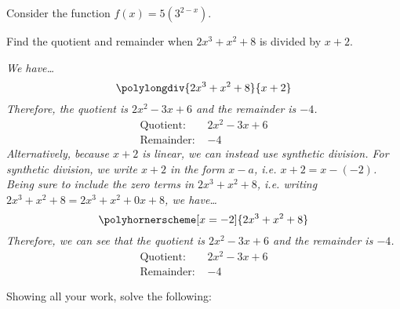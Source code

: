 \documentclass[12pt,letterpaper]{exam}
\begin{document}
\begin{questions}
\question Consider the function $f(x)= 5 \left(3^{2 - x} \right)$.



\newpage
\question[10] Find the quotient and remainder when $2x^3 + x^2 + 8$ is divided by $x + 2$. \pvspace{1cm}

{\itshape \tsol We have\dots
	\[
	\polylongdiv{2x^3 + x^2 + 8}{x + 2}
	\] \pspace
Therefore, the quotient is $2x^2 - 3x + 6$ and the remainder is $-4$.
	\[
	\begin{aligned}
	\text{Quotient: }& 2x^2 - 3x + 6 \\[0.1cm]
	\text{Remainder: }& -4
	\end{aligned}
	\] \pvspace{0.5cm}
Alternatively, because $x + 2$ is linear, we can instead use synthetic division. For synthetic division, we write $x + 2$ in the form $x - a$, i.e. $x + 2= x - (-2)$. Being sure to include the zero terms in $2x^3 + x^2 + 8$, i.e. writing $2x^3 + x^2 + 8= 2x^3 + x^2 + 0x + 8$, we have\dots
	\[
	\polyhornerscheme[x=-2]{2x^3 + x^2 + 8}
	\]
Therefore, we can see that the quotient is $2x^2 - 3x + 6$ and the remainder is $-4$.
	\[
	\begin{aligned}
	\text{Quotient: }& 2x^2 - 3x + 6 \\[0.1cm]
	\text{Remainder: }& -4
	\end{aligned}
	\] 
}



\newpage
\question[10] Showing all your work, solve the following: \par\vspace{0.5cm}
	\begin{parts}

\end{parts}
\end{questions}
\end{document}
